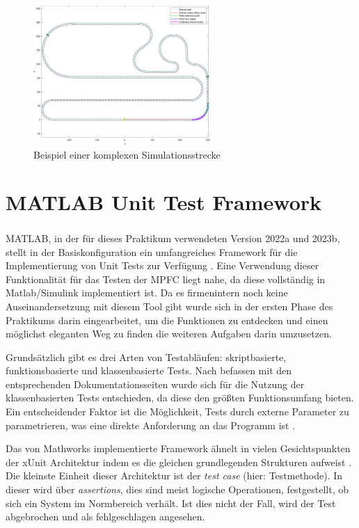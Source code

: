 
\begin{figure}
    \centering
    \includegraphics[width=0.6\textwidth]{figures/3_Implementierung/simulationsumgebung.pdf}
    \caption{Beispiel einer komplexen Simulationsstrecke}
    \label{fig:Simulation_Strecke}
\end{figure}

\section{MATLAB Unit Test Framework} \label{sec:MatlabUnitTest}

MATLAB\textsuperscript{\textregistered}, in der für dieses Praktikum verwendeten Version 2022a und 2023b, stellt in der Basiskonfiguration ein umfangreiches Framework für die Implementierung von Unit Tests zur Verfügung \cite{matlabTest}. Eine Verwendung dieser Funktionalität für das Testen der MPFC liegt nahe, da diese vollständig in Matlab/Simulink implementiert ist. Da es firmenintern noch keine Auseinandersetzung mit diesem Tool gibt wurde sich in der ersten Phase des Praktikums darin eingearbeitet, um die Funktionen zu entdecken und einen möglichst eleganten Weg zu finden die weiteren Aufgaben darin umzusetzen.

Grundsätzlich gibt es drei Arten von Testabläufen: skriptbasierte, funktionsbasierte und klassenbasierte Tests. Nach befassen mit den entsprechenden Dokumentationsseiten wurde sich für die Nutzung der klassenbasierten Tests entschieden, da diese den größten Funktionsumfang bieten. Ein entscheidender Faktor ist die Möglichkeit, Tests durch externe Parameter zu parametrieren, was eine direkte Anforderung an das Programm ist \cite{matlabTest}.

Das von Mathworks implementierte Framework ähnelt in vielen Gesichtspunkten der xUnit Architektur indem es die gleichen grundlegenden Strukturen aufweist \cite{xUnitWiki}. Die kleinste Einheit dieser Architektur ist der \textit{test case} (hier: Testmethode). In dieser wird über \textit{assertions}, dies sind meist logische Operationen, festgestellt, ob sich ein System im Normbereich verhält. Ist dies nicht der Fall, wird der Test abgebrochen und als fehlgeschlagen angesehen.

